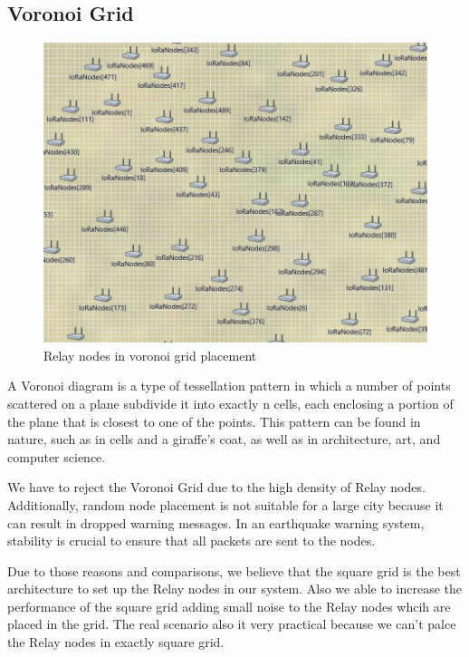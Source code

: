 \subsection{Voronoi Grid}



\begin{figure}[ht!]
    \centering
    \includegraphics[scale=0.3]{images/voronoi_grid.png}
    \caption{Relay nodes in voronoi grid placement}
\end{figure}

A Voronoi diagram is a type of tessellation pattern in which a number of points scattered on a plane subdivide it into exactly n cells, each enclosing a portion of the plane that is closest to one of the points. This pattern can be found in nature, such as in cells and a giraffe's coat, as well as in architecture, art, and computer science.

We have to reject the Voronoi Grid due to the high density of Relay nodes. Additionally, random node placement is not suitable for a large city because it can result in dropped warning messages. In an earthquake warning system, stability is crucial to ensure that all packets are sent to the nodes.

Due to those reasons and comparisons, we believe that the square grid is the best architecture to set up the Relay nodes in our system. Also we able to increase the performance of the square grid adding small noise to the Relay nodes whcih are placed in the grid. The real scenario also it very practical because we can't palce the Relay nodes in exactly square grid. 

